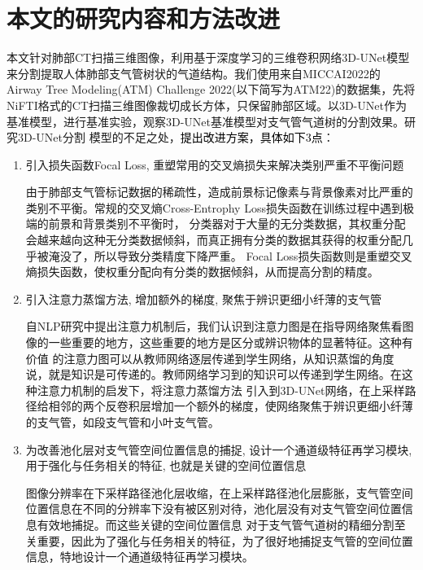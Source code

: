 \section{本文的研究内容和方法改进}

本文针对肺部CT扫描三维图像，利用基于深度学习的三维卷积网络3D-UNet模型\cite{ronneberger2015u}来分割提取人体肺部支气管树状的气道结构。我们使用来自MICCAI2022的
Airway Tree Modeling(ATM) Challenge 2022(以下简写为ATM22\cite{Zhang2022CFDA, Qin2019AirwayNet, Yu2022Bronchi, Zhang2021Airway})的数据集，先将
NiFTI格式的CT扫描三维图像裁切成长方体，只保留肺部区域。以3D-UNet作为基准模型，进行基准实验，观察3D-UNet基准模型对支气管气道树的分割效果。研究3D-UNet分割
模型的不足之处，\textcolor{black}{提出改进方案，具体如下3点}：

\begin{enumerate}

\item {\kaishu 引入损失函数Focal Loss, 重塑常用的交叉熵损失来解决类别严重不平衡问题}

由于肺部支气管标记数据的稀疏性，造成前景标记像素与背景像素对比严重的类别不平衡。常规的交叉熵Cross-Entrophy Loss损失函数在训练过程中遇到极端的前景和背景类别不平衡时，
分类器对于大量的无分类数据，其权重分配会越来越向这种无分类数据倾斜，而真正拥有分类的数据其获得的权重分配几乎被淹没了，所以导致分类精度下降严重。
Focal Loss损失函数则是重塑交叉熵损失函数，使权重分配向有分类的数据倾斜，从而提高分割的精度。

\item {\kaishu 引入注意力蒸馏方法, 增加额外的梯度, 聚焦于辨识更细小纤薄的支气管}

自NLP研究中提出注意力机制\cite{NIPS2017Attention}后，我们认识到注意力图是在指导网络聚焦看图像的一些重要的地方，这些重要的地方是区分或辨识物体的显著特征。这种有价值
的注意力图可以从教师网络逐层传递到学生网络，从知识蒸馏的角度说，就是知识是可传递的。教师网络学习到的知识可以传递到学生网络。在这种注意力机制的启发下，将注意力蒸馏方法
引入到3D-UNet网络，在上采样路径给相邻的两个反卷积层增加一个额外的梯度，使网络聚焦于辨识更细小纤薄的支气管，如段支气管和小叶支气管。

\item {\kaishu 为改善池化层对支气管空间位置信息的捕捉, 设计一个通道级特征再学习模块, 用于强化与任务相关的特征, 也就是关键的空间位置信息}

图像分辨率在下采样路径池化层收缩，在上采样路径池化层膨胀，支气管空间位置信息在不同的分辨率下没有被区别对待，池化层没有对支气管空间位置信息有效地捕捉。而这些关键的空间位置信息
对于支气管气道树的精细分割至关重要，因此为了强化与任务相关的特征，为了很好地捕捉支气管的空间位置信息，特地设计一个通道级特征再学习模块。

\end{enumerate}


